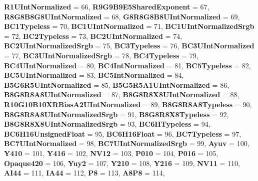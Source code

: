 \begin{DoxyCompactItemize}
\newline
{\bfseries R1\+U\+Int\+Normalized} = 66, 
{\bfseries R9\+G9\+B9\+E5\+Shared\+Exponent} = 67, 
{\bfseries R8\+G8\+B8\+G8\+U\+Int\+Normalized} = 68, 
{\bfseries G8\+R8\+G8\+B8\+U\+Int\+Normalized} = 69, 
\newline
{\bfseries B\+C1\+Typeless} = 70, 
{\bfseries B\+C1\+U\+Int\+Normalized} = 71, 
{\bfseries B\+C1\+U\+Int\+Normalized\+Srgb} = 72, 
{\bfseries B\+C2\+Typeless} = 73, 
\newline
{\bfseries B\+C2\+U\+Int\+Normalized} = 74, 
{\bfseries B\+C2\+U\+Int\+Normalized\+Srgb} = 75, 
{\bfseries B\+C3\+Typeless} = 76, 
{\bfseries B\+C3\+U\+Int\+Normalized} = 77, 
\newline
{\bfseries B\+C3\+U\+Int\+Normalized\+Srgb} = 78, 
{\bfseries B\+C4\+Typeless} = 79, 
{\bfseries B\+C4\+U\+Int\+Normalized} = 80, 
{\bfseries B\+C4\+Int\+Normalized} = 81, 
\newline
{\bfseries B\+C5\+Typeless} = 82, 
{\bfseries B\+C5\+U\+Int\+Normalized} = 83, 
{\bfseries B\+C5\+Int\+Normalized} = 84, 
{\bfseries B5\+G6\+R5\+U\+Int\+Normalized} = 85, 
\newline
{\bfseries B5\+G5\+R5\+A1\+U\+Int\+Normalized} = 86, 
{\bfseries B8\+G8\+R8\+A8\+U\+Int\+Normalized} = 87, 
{\bfseries B8\+G8\+R8\+X8\+U\+Int\+Normalized} = 88, 
{\bfseries R10\+G10\+B10\+X\+R\+Bias\+A2\+U\+Int\+Normalized} = 89, 
\newline
{\bfseries B8\+G8\+R8\+A8\+Typeless} = 90, 
{\bfseries B8\+G8\+R8\+A8\+U\+Int\+Normalized\+Srgb} = 91, 
{\bfseries B8\+G8\+R8\+X8\+Typeless} = 92, 
{\bfseries B8\+G8\+R8\+X8\+U\+Int\+Normalized\+Srgb} = 93, 
\newline
{\bfseries B\+C6\+H\+Typeless} = 94, 
{\bfseries B\+C6\+H16\+Unsigned\+Float} = 95, 
{\bfseries B\+C6\+H16\+Float} = 96, 
{\bfseries B\+C7\+Typeless} = 97, 
\newline
{\bfseries B\+C7\+U\+Int\+Normalized} = 98, 
{\bfseries B\+C7\+U\+Int\+Normalized\+Srgb} = 99, 
{\bfseries Ayuv} = 100, 
{\bfseries Y410} = 101, 
\newline
{\bfseries Y416} = 102, 
{\bfseries N\+V12} = 103, 
{\bfseries P010} = 104, 
{\bfseries P016} = 105, 
\newline
{\bfseries Opaque420} = 106, 
{\bfseries Yuy2} = 107, 
{\bfseries Y210} = 108, 
{\bfseries Y216} = 109, 
\newline
{\bfseries N\+V11} = 110, 
{\bfseries A\+I44} = 111, 
{\bfseries I\+A44} = 112, 
{\bfseries P8} = 113, 
\newline
{\bfseries A8\+P8} = 114, 

\end{DoxyCompactItemize}
